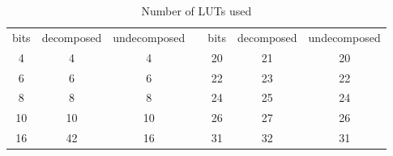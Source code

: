 \documentclass[a4paper]{article}
\begin{document}
\begin{table}%
	\centering
	\caption{Number of LUTs used}
\vspace{6pt}		
		\begin{tabular}{cccp{4mm}ccc}
\toprule		
bits & decomposed & undecomposed & & bits & decomposed & undecomposed \\
\cmidrule{1-3}
\cmidrule{5-7}
4  &  4 &  4 & & 20 & 21 & 20 \\ 
6  &  6 &  6 & & 22 & 23 & 22 \\
 8  &  8 &  8 & & 24 & 25 & 24 \\
10 & 10 & 10 & & 26 & 27 & 26 \\
16 & 42 & 16 & & 31 & 32 & 31 \\
\bottomrule
		\end{tabular}
    \label{tab:fpga_area}
\end{table}
\end{document}
